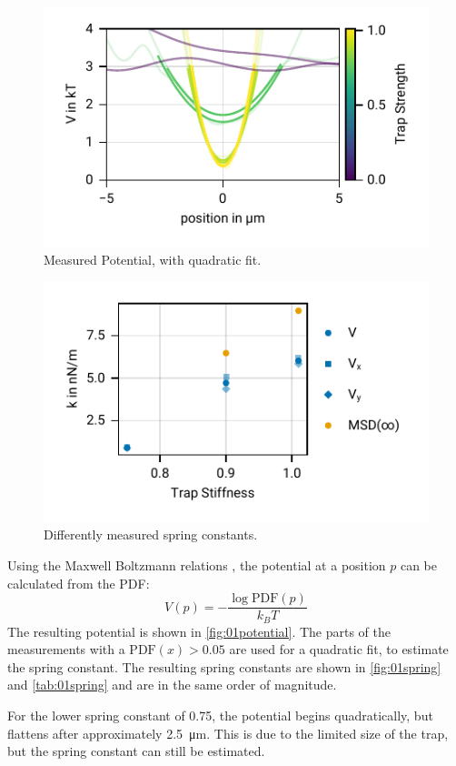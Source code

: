\documentclass[
    twoside=false,
    twocolumn=true,
    fontsize=11pt,
]{scrarticle}
\begin{document}
\begin{figure}
    \centering
    \includegraphics{figures/01_03_3_axis.pdf}
    \caption{Measured Potential, with quadratic fit.}
    \label{fig:01potential}
\end{figure}
\begin{figure}
    \centering
    \includegraphics{figures/01_03_4_spring_constants.pdf}
    \caption{Differently measured spring constants.}
    \label{fig:01spring}
\end{figure}
Using the Maxwell Boltzmann relations \cite{instructions}, the potential at a position $p$ can be calculated from the PDF:
\begin{equation}
    V(p) = - \frac{\log{\text{PDF}(p)}}{k_B T}
\end{equation}
The resulting potential is shown in \autoref{fig:01potential}.
The parts of the measurements with a $\text{PDF}(x)>0.05$ are used for a quadratic fit, to estimate the spring constant.
The resulting spring constants are shown in \autoref{fig:01spring} and \autoref{tab:01spring} and are in the same order of magnitude. 

For the lower spring constant of \SI{0.75}{}, the potential begins quadratically, but flattens after approximately \SI{2.5}{\micro m}.
This is due to the limited size of the trap, but the spring constant can still be estimated.
\end{document}
